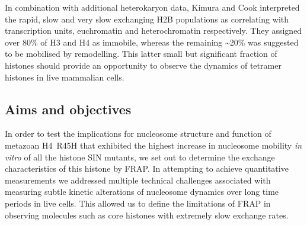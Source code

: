     In combination with additional heterokaryon data, Kimura and Cook 
    interpreted the rapid, slow and very slow exchanging H2B populations 
    as correlating with transcription units, euchromatin and heterochromatin respectively.
    They assigned over 80\% of H3 and H4 as immobile, 
    whereas the remaining \textasciitilde20\% was suggested to be mobilised by remodelling.
    This latter small but significant fraction of histones should provide an 
    opportunity to observe the dynamics of tetramer histones in live mammalian cells.

  \subsection{Aims and objectives}

    In order to test the implications for nucleosome structure and function
    of metazoan H4~R45H that exhibited the highest increase 
    in nucleosome mobility \textit{in vitro} of all the histone SIN mutants,
    we set out to determine the exchange characteristics of this histone by FRAP.
    In attempting to achieve quantitative measurements 
    we addressed multiple technical challenges associated with 
    measuring subtle kinetic alterations of nucleosome dynamics over long time periods in live cells. 
    This allowed us to define the limitations of FRAP in observing molecules 
    such as core histones with extremely slow exchange rates.
